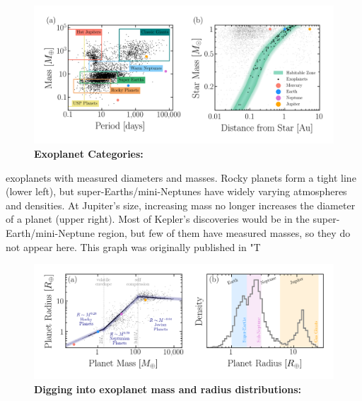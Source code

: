 \begin{figure}
\begin{center}
  \centerline{\includegraphics[width=1.\linewidth]{src/figures/scatter_categories.png}}
  \caption{\textbf{Exoplanet Categories:}  }
  \label{fig:exo_categories}
\end{center}
\end{figure}

exoplanets with measured diameters and masses. Rocky planets form a tight line (lower left), but super-Earths/mini-Neptunes have widely varying atmospheres and densities. At Jupiter’s size, increasing mass no longer increases the diameter of a planet (upper right). Most of Kepler’s discoveries would be in the super-Earth/mini-Neptune region, but few of them have measured masses, so they do not appear here. This graph was originally published in "T


\begin{figure}
\begin{center}
  \centerline{\includegraphics[width=1.\linewidth]{src/figures/radii_and_mass_relations.png}}
  \caption{\textbf{Digging into exoplanet mass and radius distributions:}  }
  \label{fig:exo_mass_radius_relations}
\end{center}
\end{figure}




